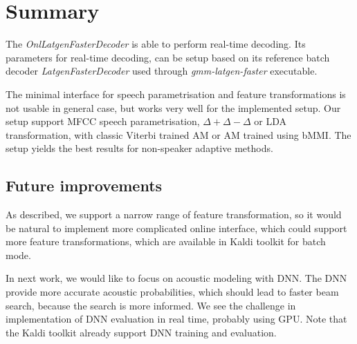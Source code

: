 \section{Summary}
\label{sec:onl_summary}
The {\it OnlLatgenFasterDecoder}\/ is able to perform real-time decoding.
Its parameters for real-time decoding, 
can be setup based on its reference batch decoder {\it LatgenFasterDecoder}\/ used through {\it gmm-latgen-faster}\/ executable.

The minimal interface for speech parametrisation and feature transformations is not usable in general case,
but works very well for the implemented setup.
Our setup support \ac{MFCC} speech parametrisation, $\Delta+\Delta-\Delta$ or \ac{LDA} transformation, with
classic Viterbi trained \ac{AM} or \ac{AM} trained using \ac{bMMI}.
The setup yields the best results for non-speaker adaptive methods.

\subsection{Future improvements}
\label{sub:onl_future}
As described, we support a narrow range of feature transformation,
so it would be natural to implement more complicated online interface,
which could support more feature transformations, 
which are available in Kaldi toolkit for batch mode. 

In next work, we would like to focus on acoustic modeling with \acl{DNN}.
The \ac{DNN} provide more accurate acoustic probabilities, 
which should lead to faster beam search,
because the search is more informed.\cite{TODO_DNN} 
We see the challenge in implementation of \acl{DNN} evaluation in real time, probably using \ac{GPU}.
Note that the Kaldi toolkit already support \ac{DNN} training and evaluation.
